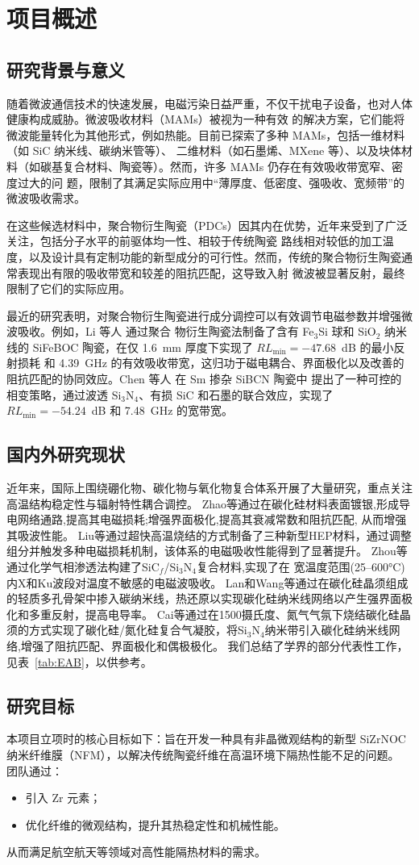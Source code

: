 \chapter{项目概述}

\section{研究背景与意义}
随着微波通信技术的快速发展，电磁污染日益严重，不仅干扰电子设备，也对人体健康构成威胁。微波吸收材料（MAMs）被视为一种有效
的解决方案，它们能将微波能量转化为其他形式，例如热能。目前已探索了多种 MAMs，包括一维材料（如 SiC 纳米线、碳纳米管等）、
二维材料（如石墨烯、MXene 等）、以及块体材料（如碳基复合材料、陶瓷等）。然而，许多 MAMs 仍存在有效吸收带宽窄、密度过大的问
题，限制了其满足实际应用中“薄厚度、低密度、强吸收、宽频带”的微波吸收需求。

在这些候选材料中，聚合物衍生陶瓷（PDCs）因其内在优势，近年来受到了广泛关注，包括分子水平的前驱体均一性、相较于传统陶瓷
路线相对较低的加工温度，以及设计具有定制功能的新型成分的可行性。然而，传统的聚合物衍生陶瓷通常表现出有限的吸收带宽和较差的阻抗匹配，这导致入射
微波被显著反射，最终限制了它们的实际应用。

最近的研究表明，对聚合物衍生陶瓷进行成分调控可以有效调节电磁参数并增强微波吸收。例如，Li 等人\cite{li2025electromagnetic} 通过聚合
物衍生陶瓷法制备了含有 Fe$_3$Si 球和 SiO$_2$ 纳米线的 SiFeBOC 陶瓷，在仅 1.6~mm 厚度下实现了 $RL_{\min} = -47.68$~dB 的最小反射损耗
和 4.39~GHz 的有效吸收带宽，这归功于磁电耦合、界面极化以及改善的阻抗匹配的协同效应。Chen 等人\cite{CHEN2025181401} 在 Sm 掺杂 SiBCN 陶瓷中
提出了一种可控的相变策略，通过波透 Si$_3$N$_4$、有损 SiC 和石墨的联合效应，实现了 $RL_{\min} = -54.24$~dB 和 7.48~GHz 的宽带宽。
\section{国内外研究现状}
近年来，国际上围绕硼化物、碳化物与氧化物复合体系开展了大量研究，重点关注高温结构稳定性与辐射特性耦合调控\cite{wang2023hightemp,liu2024emissivity}。
Zhao等\cite{zhao2022a}通过在碳化硅材料表面镀银,形成导电网络通路,提高其电磁损耗;增强界面极化,提高其衰减常数和阻抗匹配, 从而增强其吸波性能。
Liu等\cite{liu2025}通过超快高温烧结的方式制备了三种新型HEP材料，通过调整组分并触发多种电磁损耗机制，该体系的电磁吸收性能得到了显著提升。
Zhou等\cite{zhou2019}通过化学气相渗透法构建了SiC$_f$/Si$_3$N$_4$复合材料,实现了在 宽温度范围(25–600°C)内X和Ku波段对温度不敏感的电磁波吸收。
Lan和Wang等\cite{lan2020}通过在碳化硅晶须组成的轻质多孔骨架中掺入碳纳米线，热还原以实现碳化硅纳米线网络以产生强界面极化和多重反射，提高电导率。
Cai等\cite{cai2024}通过在1500摄氏度、氮气气氛下烧结碳化硅晶须的方式实现了碳化硅/氮化硅复合气凝胶，将Si$_3$N$_4$纳米带引入碳化硅纳米线网络,增强了阻抗匹配、界面极化和偶极极化。
我们总结了学界的部分代表性工作，见表~\ref{tab:EAB}，以供参考。

\section{研究目标}
本项目立项时的核心目标如下：旨在开发一种具有非晶微观结构的新型 SiZrNOC 纳米纤维膜（NFM），以解决传统陶瓷纤维在高温环境下隔热性能不足的问题。
团队通过：
\begin{itemize}
    \item 引入 Zr 元素；
    \item 优化纤维的微观结构，提升其热稳定性和机械性能。
\end{itemize}
从而满足航空航天等领域对高性能隔热材料的需求。